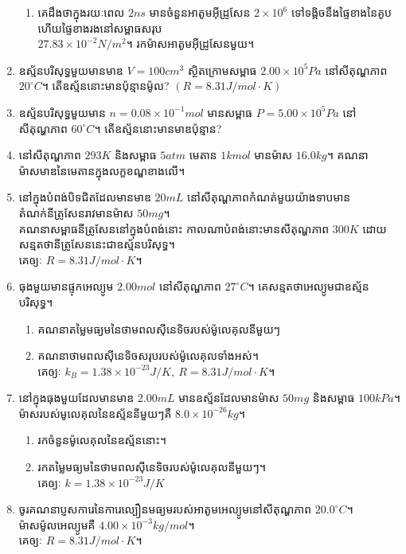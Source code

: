 \documentclass[12pt, a4paper]{article}
\begin{document}
\begin{enumerate}[m]
\begin{enumerate}[k]
		\item គេដឹងថាក្នុងរយៈពេល $2ns$ មានចំនួនអាតូមអុីដ្រូសែន $2\times10^{6}$ ទៅទង្គិចនឹងផ្ទៃខាងនៃគូបហើយផ្ទៃខាងរងនៅសម្ពាធសរុប\\ $27.83\times10^{-2}N/m^{2}$។ រកម៉ាសអាតូមអុីដ្រូសែនមួយ។
	\end{enumerate}
	\item ឧស្ម័នបរិសុទ្ធមួយមានមាឌ $V=100cm^{3}$ ស្ថិតក្រោមសម្ពាធ $2.00\times10^{5}Pa$ នៅសីតុណ្ហភាព $20^\circ C$។ តើឧស្ម័ននោះមានប៉ុន្មានម៉ូល? $\left(R=8.31J/mol\cdot K\right)$
	\item ឧស្ម័នបរិសុទ្ធមួយមាន $n=0.08\times10^{-1}mol$ មានសម្ពាធ $P=5.00\times10^{5}Pa$ នៅសីតុណ្ហភាព $60^\circ C$។ តើឧស្ម័ននោះមានមាឌប៉ុន្មាន?
	\item នៅសីតុណ្ហភាព $293K$ និងសម្ពាធ $5atm$ មេតាន $1kmol$ មានម៉ាស $16.0kg$។ គណនាម៉ាសមាឌនៃមេតានក្នុងលក្ខខណ្ឌខាងលើ។
	\item នៅក្នុងបំពង់បិទជិតដែលមានមាឌ $20mL$ នៅសីតុណ្ហភាពកំណត់មួយយ៉ាងទាបមានតំណក់នីត្រូសែនរាវមានម៉ាស $50mg$។\\ គណនាសម្ពាធនីត្រូសែននៅក្នុងបំពង់នោះ កាលណាបំពង់នោះមានសីតុណ្ហភាព $300K$ ដោយសន្មតថានីត្រូសែននេះជាឧស្ម័នបរិសុទ្ធ។\\ គេឲ្យៈ $R=8.31J/mol\cdot K$។
	\item ធុងមួយមានផ្ទុកអេល្យូម $2.00mol$ នៅសីតុណ្ហភាព $27^\circ C$។ គេសន្មតថាអេល្យូមជាឧស្ម័នបរិសុទ្ធ។
	\begin{enumerate}[k]
		\item គណនាតម្លៃមធ្យមនៃថាមពលសុីនេទិចរបស់ម៉ូលេគុលនីមួយៗ
		\item គណនាថាមពលសុីនេទិចសរុបរបស់ម៉ូលេគុលទាំងអស់។\\
		គេឲ្យៈ $k_{B}=1.38\times10^{-23}J/K,~R=8.31J/mol\cdot K$។
	\end{enumerate}
	\item នៅក្នុងធុងមួយដែលមានមាឌ $2.00mL$ មានឧស្ម័នដែលមានម៉ាស $50mg$ និងសម្ពាធ $100kPa$។\\ ម៉ាសរបស់មូលេគុលនៃឧស្ម័ននីមួយៗគឺ $8.0\times10^{-26}kg$។
	\begin{enumerate}[k]
		\item រកចំនួនម៉ូលេគុលនៃឧស្ម័ននោះ។
		\item រកតម្លៃមធ្យមនៃថាមពលសុីនេទិចរបស់ម៉ូលេគុលនីមួយៗ។\\គេឲ្យៈ $k=1.38\times10^{-23}J/K$
	\end{enumerate}
	\item ចូរគណនាប្ញសការេនៃការេល្បឿនមធ្យមរបស់អាតូមអេល្យូមនៅសីតុណ្ហភាព $20.0^\circ C$។ ម៉ាសម៉ូលអេល្យូមគឺ $4.00\times10^{-3}kg/mol$។ \\គេឲ្យៈ $R=8.31J/mol\cdot K$។

\end{enumerate}
\end{document}
